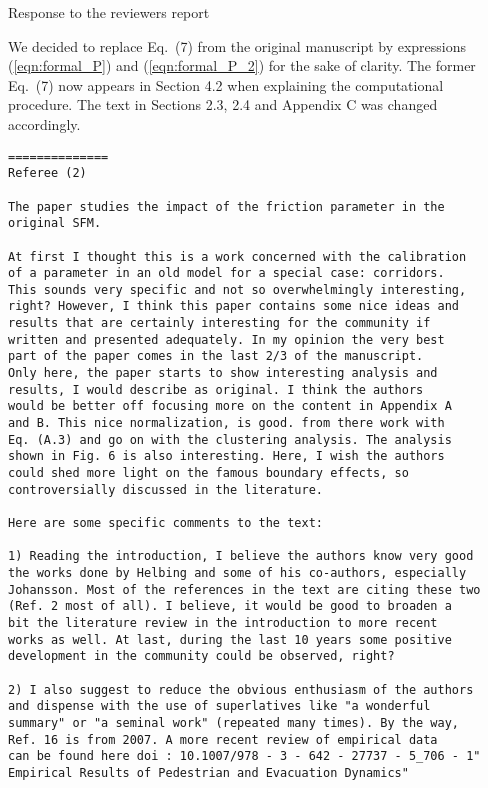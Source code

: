 \documentclass[a4paper,12pt]{letter}
\begin{document}
\begin{letter}{Response to the reviewers report}
{We decided to replace Eq.~(7) from the original manuscript by expressions 
(\ref{eqn:formal_P}) and (\ref{eqn:formal_P_2}) for the sake of clarity. The 
former Eq.~(7) now appears in Section 4.2 when explaining the computational 
procedure. The text in Sections 2.3, 2.4 and Appendix C was changed accordingly. 
\\
\fi

}

\newpage

\begin{verbatim}
==============
Referee (2)

The paper studies the impact of the friction parameter in the 
original SFM.

At first I thought this is a work concerned with the calibration 
of a parameter in an old model for a special case: corridors. 
This sounds very specific and not so overwhelmingly interesting,
right? However, I think this paper contains some nice ideas and 
results that are certainly interesting for the community if 
written and presented adequately. In my opinion the very best 
part of the paper comes in the last 2/3 of the manuscript.
Only here, the paper starts to show interesting analysis and 
results, I would describe as original. I think the authors 
would be better off focusing more on the content in Appendix A
and B. This nice normalization, is good. from there work with 
Eq. (A.3) and go on with the clustering analysis. The analysis 
shown in Fig. 6 is also interesting. Here, I wish the authors 
could shed more light on the famous boundary effects, so
controversially discussed in the literature.

Here are some specific comments to the text:

1) Reading the introduction, I believe the authors know very good 
the works done by Helbing and some of his co-authors, especially 
Johansson. Most of the references in the text are citing these two 
(Ref. 2 most of all). I believe, it would be good to broaden a 
bit the literature review in the introduction to more recent 
works as well. At last, during the last 10 years some positive 
development in the community could be observed, right?

2) I also suggest to reduce the obvious enthusiasm of the authors 
and dispense with the use of superlatives like "a wonderful 
summary" or "a seminal work" (repeated many times). By the way, 
Ref. 16 is from 2007. A more recent review of empirical data 
can be found here doi : 10.1007/978 - 3 - 642 - 27737 - 5_706 - 1"
Empirical Results of Pedestrian and Evacuation Dynamics"


\end{verbatim}
\end{letter}
\end{document}
